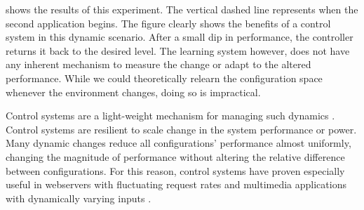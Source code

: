  shows the results of this experiment.
The vertical dashed line represents when the second application
begins.  The figure clearly shows the benefits of a control system in
this dynamic scenario.  After a small dip in performance, the
controller returns it back to the desired level.  The learning system
however, does not have any inherent mechanism to measure the change or
adapt to the altered performance.  While we could theoretically
relearn the configuration space whenever the environment changes,
doing so is impractical.

Control systems are a light-weight mechanism for managing such
dynamics \cite{Hellerstein2004a}. Control systems are resilient to
scale change in the system performance or power.  Many dynamic changes
reduce all configurations' performance almost uniformly, changing the
magnitude of performance without altering the relative difference
between configurations.  For this reason, control systems have proven
especially useful in webservers with fluctuating request rates
\cite{Horvarth,LuEtAl-2006a,SunDaiPan-2008a} and multimedia
applications with dynamically varying inputs
\cite{TCST,Agilos,grace2}.





